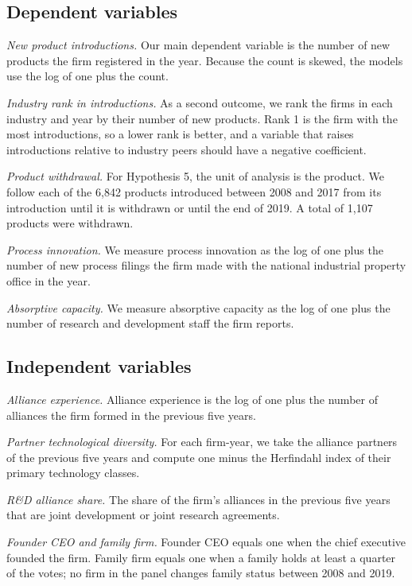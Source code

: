 \documentclass[12pt]{article}
\begin{document}
\subsection{Dependent variables}

\textit{New product introductions.} Our main dependent variable is the number of new products the firm registered in the year. Because the count is skewed, the models use the log of one plus the count.

\textit{Industry rank in introductions.} As a second outcome, we rank the firms in each industry and year by their number of new products. Rank 1 is the firm with the most introductions, so a lower rank is better, and a variable that raises introductions relative to industry peers should have a negative coefficient.

\textit{Product withdrawal.} For Hypothesis 5, the unit of analysis is the product. We follow each of the 6,842 products introduced between 2008 and 2017 from its introduction until it is withdrawn or until the end of 2019. A total of 1,107 products were withdrawn.

\textit{Process innovation.} We measure process innovation as the log of one plus the number of new process filings the firm made with the national industrial property office in the year.

\textit{Absorptive capacity.} We measure absorptive capacity as the log of one plus the number of research and development staff the firm reports.

\subsection{Independent variables}

\textit{Alliance experience.} Alliance experience is the log of one plus the number of alliances the firm formed in the previous five years.

\textit{Partner technological diversity.} For each firm-year, we take the alliance partners of the previous five years and compute one minus the Herfindahl index of their primary technology classes.

\textit{R\&D alliance share.} The share of the firm's alliances in the previous five years that are joint development or joint research agreements.

\textit{Founder CEO and family firm.} Founder CEO equals one when the chief executive founded the firm. Family firm equals one when a family holds at least a quarter of the votes; no firm in the panel changes family status between 2008 and 2019.
\end{document}
